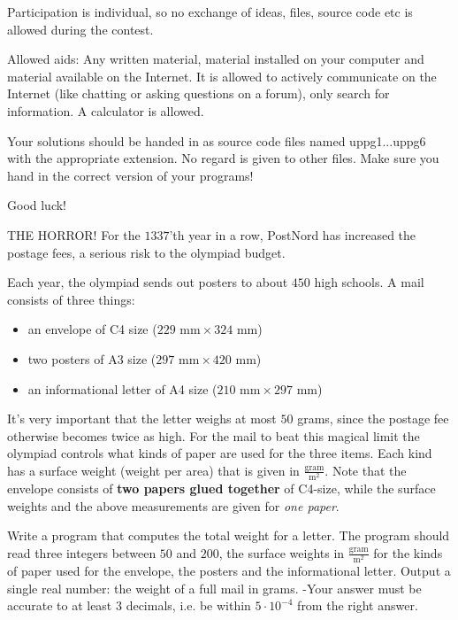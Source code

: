 \begin{lista}
\item Participation is individual, so no exchange of ideas, files, source code etc is allowed during the contest.
\item Allowed aids: Any written material, material installed on your computer and material available on the Internet.
  It is  allowed to actively communicate on the Internet (like chatting or asking questions on a forum), only search for information.
  A calculator is allowed.
\item Your solutions should be handed in as source code files named uppg1...uppg6 with the appropriate extension.
  No regard is given to other files.
  Make sure you hand in the correct version of your programs!
\end{lista}

\begin{center}
\Large Good luck!
\end{center}
%

\newpage
{}

THE HORROR!
For the $1337$'th year in a row, PostNord has increased the postage fees, a serious risk to the olympiad budget.

Each year, the olympiad sends out posters to about $450$ high schools.
A mail consists of three things:
\begin{itemize}
\item an envelope of C4 size ($229\text{ mm} \times 324\text{ mm}$)
\item two posters of A3 size ($297\text{ mm} \times 420\text{ mm}$)
\item an informational letter of A4 size ($210\text{ mm} \times 297\text{ mm}$)
\end{itemize}

It's very important that the letter weighs at most $50$ grams, since the postage fee otherwise becomes twice as high.
For the mail to beat this magical limit the olympiad controls what kinds of paper are used for the three items.
Each kind has a surface weight (weight per area) that is given in $\frac{\text{gram}}{\text{m}^2}$.
Note that the envelope consists of \textbf{two papers glued together} of C4-size, while the surface weights and the above measurements are given for \emph{one paper}.

Write a program that computes the total weight for a letter.
The program should read three integers between $50$ and $200$, the surface weights in $\frac{\text{gram}}{\text{m}^2}$ for the kinds of paper used for the envelope, the posters and the informational letter.
Output a single real number: the weight of a full mail in grams.
-Your answer must be accurate to at least $3$ decimals, i.e. be within $5 \cdot 10^{-4}$ from the right answer.

